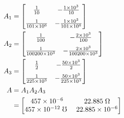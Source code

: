 \begin{enumerate}
{	\begin{align*}
	A_1 &= 
	\left[ \begin{matrix}
	\frac{1}{\Aone} 			& -\frac{\Roone}{\Aone} \\[6pt] 
	\frac{1}{\Aone \Rione }		& -\frac{\Roone}{\Aone \Rione}
	\end{matrix}  \right] 
	\\
	A_2 &= 
	\left[ \begin{matrix}
	\frac{1}{\Atwo} 			& -\frac{\Rotwo}{\Atwo} \\[6pt] 
	\frac{1}{\Atwo \Ritwo }		& -\frac{\Rotwo}{\Atwo \Ritwo}
	\end{matrix}  \right] 
	\\
	A_3 &= 
	\left[ \begin{matrix}
	\frac{1}{\Athree} 			& -\frac{\Rothree}{\Athree} \\[6pt] 
	\frac{1}{\Athree \Rithree }	& -\frac{\Rothree}{\Athree \Rithree}
	\end{matrix}  \right] 
	\\
	A &= A_1 A_2 A_3
	\\
	&= \left[ \begin{matrix}
	\Aoneone 			& \Aonetwo \; \Omega \\ 
	\Atwoone \; \mho \	& \Atwotwo
	\end{matrix}  \right] 
	\end{align*}
	}
\end{enumerate}